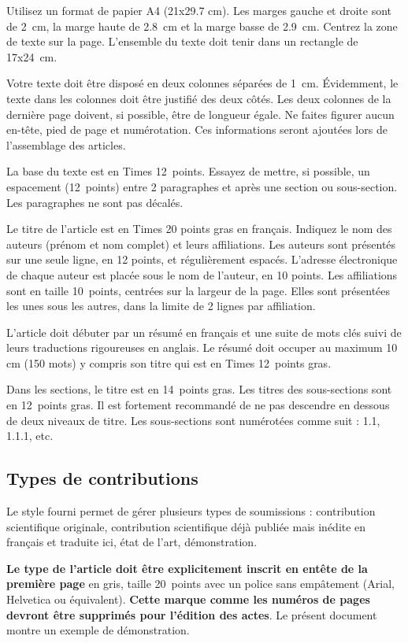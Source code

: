 \documentclass[demonstration]{jfsma}
\begin{document}
Utilisez un format de papier A4 (21x29.7 cm). Les marges gauche et droite sont
de 2~cm, la marge haute de 2.8~cm et la marge basse de 2.9~cm. Centrez la zone
de texte sur la page. L'ensemble du texte doit tenir dans un rectangle de
17x24~cm.

Votre texte doit être disposé en deux colonnes séparées de 1~cm. Évidemment, le
texte dans les colonnes doit être justifié des deux côtés. Les deux colonnes de
la dernière page doivent, si possible, être de longueur égale. Ne faites figurer
aucun en-tête, pied de page et numérotation. Ces informations seront ajoutées
lors de l'assemblage des articles.

La base du texte est en Times 12~points. Essayez de mettre, si possible, un
espacement (12~points) entre 2 paragraphes et après une section ou
sous-section. Les paragraphes ne sont pas décalés.

Le titre de l'article est en Times 20 points gras en français. Indiquez le nom
des auteurs (prénom et nom complet) et leurs affiliations. Les auteurs sont
présentés sur une seule ligne, en 12 points, et régulièrement espacés. L'adresse
électronique de chaque auteur est placée sous le nom de l'auteur, en 10 points.
Les affiliations sont en taille 10~points, centrées sur la largeur de la page.
Elles sont présentées les unes sous les autres, dans la limite de 2 lignes par
affiliation.

L'article doit débuter par un résumé en français et une suite de mots clés
suivi de leurs traductions rigoureuses en anglais. Le résumé doit occuper au
maximum 10 cm (150 mots) y compris son titre qui est en Times 12~points gras.

Dans les sections, le titre est en 14~points gras. Les titres des
sous-sections sont en 12~points gras. Il est fortement recommandé de ne pas
descendre en dessous de deux niveaux de titre. Les sous-sections sont
numérotées comme suit : 1.1, 1.1.1, etc.

\subsection{Types de contributions}

Le style fourni permet de gérer plusieurs types de soumissions : contribution
scientifique originale, contribution scientifique déjà publiée mais
inédite en français et traduite ici, état de l'art, démonstration.

\textbf{Le type de l'article doit être explicitement inscrit en entête de la
  première page} en gris, taille 20~points avec un police sans empâtement
(Arial, Helvetica ou équivalent). \textbf{Cette marque comme les numéros de
  pages devront être supprimés pour l'édition des actes}. Le présent document
montre un exemple de démonstration.
\end{document}
